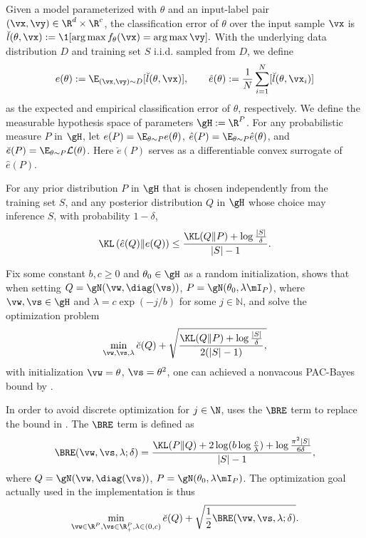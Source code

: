 \label{sec:appendix_pac}
Given a model parameterized with $\theta$ and an input-label pair $(\vx,\vy)\in\R^d\times \R^c$, the classification error of $\theta$ over the input sample $\vx$ is $\breve{l}(\theta, \vx) := \1[\arg\max f_\theta(\vx) = \arg\max\vy].$ With the underlying data distribution $D$ and training set $S$ i.i.d. sampled from $D$, we define
\begin{equation}
e(\theta):=\E_{(\vx, \vy)\sim D}[\breve{l}(\theta,\vx)],\qquad \hat{e}(\theta):=\frac{1}{N}\sum_{i=1}^N[\breve{l}(\theta,\vx_i)]
\end{equation}
as the expected and empirical classification error of $\theta$, respectively.
We define the measurable hypothesis space of parameters $\gH:= \R^P$.
For any probabilistic measure $P$ in $\gH$, let $e(P) = \E_{\theta\sim P}e(\theta)$, $\hat{e}(P) = \E_{\theta\sim P}\hat{e}(\theta)$, and $\breve{e}(P) = \E_{\theta\sim P}\mathcal{L}(\theta)$. Here $\breve{e}(P)$ serves as a differentiable convex surrogate of $\hat{e}(P).$

\begin{theorem}
\citep{mcallester1999some}\citep{langford2001bounds}
For any prior distribution $P$ in $\gH$ that is chosen independently from the training set $S$, and any posterior distribution $Q$ in $\gH$ whose choice may inference $S$, with probability $1-\delta$,
\begin{equation}
    \label{eqn:appendix_pac_bayes_inf}
    \KL\left(\hat{e}(Q)\Vert e(Q)\right)\leq \frac{\KL(Q\Vert P) + \log\frac{|S|}{\delta}}{|S|-1}.
\end{equation}
\end{theorem}
Fix some constant $b, c \geq 0$ and $\theta_0\in\gH$ as a random initialization, \citet{dziugaite2017computing} shows that when setting $Q = \gN(\vw, \diag(\vs))$, $P = \gN(\theta_0, \lambda\mI_P)$, where $\vw, \vs\in\gH$ and $\lambda = c\exp{(-j/ b)}$ for some $j\in\mathbb{N}$, and solve the optimization problem
\begin{equation}
    \min_{\vw,\vs,\lambda}\breve{e}(Q) + \sqrt{\frac{\KL(Q\Vert P) + \log\frac{|S|}{\delta}}{2(|S|-1)},}
\end{equation} with initialization $\vw = \theta$, $\vs = \theta^2$,
one can achieved a nonvacous PAC-Bayes bound by .

In order to avoid discrete optimization for $j\in \N$, \citet{dziugaite2017computing} uses the $\BRE$ term to replace the bound in . The $\BRE$ term is defined as
\begin{equation}
    \BRE(\vw,\vs,\lambda; \delta) = \frac{\KL(P\Vert Q)+2\log(b\log \frac{c}{\lambda})+\log \frac{\pi^2 |S|}{6\delta}} {|S|-1},
\end{equation}
where $Q = \gN(\vw, \diag(\vs))$, $P = \gN(\theta_0, \lambda\mI_P)$.
The optimization goal actually used in the implementation is thus
\begin{equation}
    \min_{\vw \in \R^P,\vs\in \R^P_+,\lambda\in (0,c)}\breve{e}(Q) + \sqrt{\frac{1}{2}\BRE(\vw,\vs,\lambda; \delta)}.
\end{equation}

